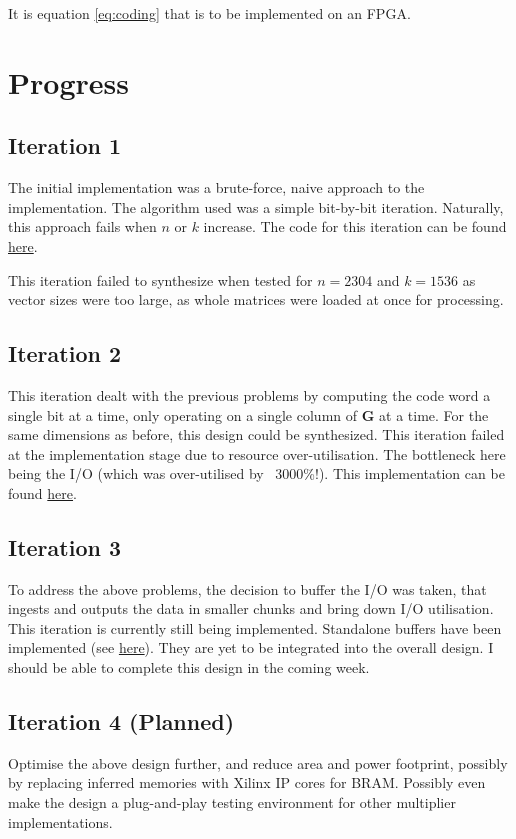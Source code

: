 \documentclass[a4paper,12pt]{article}
\begin{document}
It is equation \ref{eq:coding} that is to be implemented on an FPGA.

\section{Progress}

\subsection{Iteration 1}
The initial implementation was a brute-force, naive approach to the
implementation. The algorithm used was a simple bit-by-bit iteration.
Naturally, this approach fails when $n$ or $k$ increase. The code for this
iteration can be found
\href{https://github.com/CodePurble/ldpc-fpga/blob/main/hdl/encode.v}{here}.

This iteration failed to synthesize when tested for $n = 2304$ and $k = 1536$
as vector sizes were too large, as whole matrices were loaded at once for
processing.

\subsection{Iteration 2}
This iteration dealt with the previous problems by computing the code word a
single bit at a time, only operating on a single column of $\boldsymbol{G}$ at
a time. For the same dimensions as before, this design could be synthesized.
This iteration failed at the implementation stage due to resource
over-utilisation. The bottleneck here being the I/O (which was over-utilised by
~3000\%!). This implementation can be found
\href{https://github.com/CodePurble/ldpc-fpga/commit/9727b4bf16ffcc5572a6b557ddc749873093d5c3}{here}.

\subsection{Iteration 3}
To address the above problems, the decision to buffer the I/O was taken, that
ingests and outputs the data in smaller chunks and bring down I/O utilisation.
This iteration is currently still being implemented. Standalone buffers have
been implemented (see
\href{https://github.com/CodePurble/ldpc-fpga/tree/re-arch#readme}{here}). They
are yet to be integrated into the overall design. I should be able to complete
this design in the coming week.

\subsection{Iteration 4 (Planned)}
Optimise the above design further, and reduce area and power footprint,
possibly by replacing inferred memories with Xilinx IP cores for BRAM. Possibly
even make the design a plug-and-play testing environment for other multiplier
implementations.

\printbibliography
\end{document}
